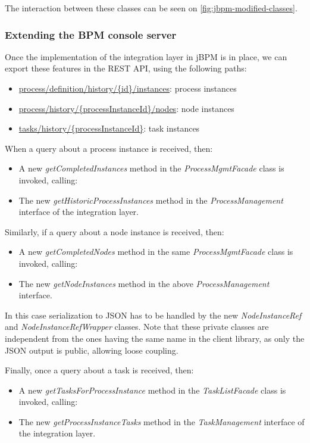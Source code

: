 The interaction between these classes can be seen on \autoref{fig:jbpm-modified-classes}.

\subsubsection*{Extending the BPM console server}

Once the implementation of the integration layer in jBPM is in place, we can
export these features in the REST API, using the following paths:

\begin{itemize}
\item \url{process/definition/history/{id}/instances}: process instances
\item \url{process/history/{processInstanceId}/nodes}: node instances
\item \url{tasks/history/{processInstanceId}}: task instances
\end{itemize}

When a query about a process instance is received, then:

\begin{itemize}
\item A new \emph{getCompletedInstances} method in the \emph{ProcessMgmtFacade} class is invoked, calling:
\item The new \emph{getHistoricProcessInstances} method in the \emph{ProcessManagement} interface of the integration layer.
\end{itemize}

Similarly, if a query about a node instance is received, then:

\begin{itemize}
\item A new \emph{getCompletedNodes} method in the same \emph{ProcessMgmtFacade} class is invoked, calling:
\item The new \emph{getNodeInstances} method in the above \emph{ProcessManagement} interface.
\end{itemize}

In this case serialization to JSON has to be handled by the new
\emph{NodeInstanceRef} and \emph{NodeInstanceRefWrapper} classes. Note that
these private classes are independent from the ones having the same name in the
client library, as only the JSON output is public, allowing loose coupling.

Finally, once a query about a task is received, then:

\begin{itemize}
\item A new \emph{getTasksForProcessInstance} method in the \emph{TaskListFacade} class is invoked, calling:
\item The new \emph{getProcessInstanceTasks} method in the \emph{TaskManagement} interface of the integration layer.
\end{itemize}

